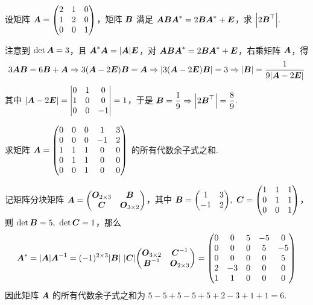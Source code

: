 \begin{example}
    设矩阵 $\vb*{A}=\mqty(2&1&0\\1&2&0\\0&0&1)$，矩阵 $\vb*{B}$ 满足 $\vb*{ABA}^*=2\vb*{BA}^*+\vb*{E}$，求 $\qty|2\vb*{B}^\top|.$
\end{example}
\begin{solution}
    注意到 $\det\vb*{A}=3$，且 $\vb*{A}^*\vb*{A}=|\vb*{A}|\vb*{E}$，对 $\vb*{ABA}^*=2\vb*{BA}^*+\vb*{E}$，右乘矩阵 $\vb*{A}$，得 
    $$3\vb*{AB}=6\vb*{B}+\vb*{A}\Rightarrow 3(\vb*{A}-2\vb*{E})\vb*{B}=\vb*{A}\Rightarrow |3(\vb*{A}-2\vb*{E})\vb*{B}|=3\Rightarrow |\vb*{B}|=\dfrac{1}{9|\vb*{A}-2\vb*{E}|}$$
    其中 $|\vb*{A}-2\vb*{E}|=\mqty|0&1&0\\1&0&0\\0&0&-1|=1$，于是 $\vb*{B}=\dfrac{1}{9}\Rightarrow \qty|2\vb*{B}^\top|=\dfrac{8}{9}.$
\end{solution}

\begin{example}
    求矩阵 $\vb*{A}=\mqty(0&0&0&1&3\\0&0&0&-1&2\\1&1&1&0&0\\0&1&1&0&0\\0&0&1&0&0)$ 的所有代数余子式之和.
\end{example}
\begin{solution}
    记矩阵分块矩阵 $\vb*{A}=\mqty(\vb*{O}_{2\times 3}&\vb*{B}\\\vb*{C}&\vb*{O}_{3\times 2})$，其中 $\vb*{B}=\mqty(1&3\\-1&2),~\vb*{C}=\mqty(1&1&1\\0&1&1\\0&0&1)$，则 $\det\vb*{B}=5,~\det\vb*{C}=1$，那么
    $$\vb*{A}^*=|\vb*{A}|\vb*{A}^{-1}=(-1)^{2\times 3}|\vb*{B}|~|\vb*{C}|\mqty(\vb*{O}_{3\times 2}&\vb*{C}^{-1}\\\vb*{B}^{-1}&\vb*{O}_{2\times 3})=\mqty(0&0&5&-5&0\\0&0&0&5&-5\\0&0&0&0&5\\2&-3&0&0&0\\1&1&0&0&0)$$
    因此矩阵 $\vb*{A}$ 的所有代数余子式之和为 $5-5+5-5+5+2-3+1+1=6.$
\end{solution}

